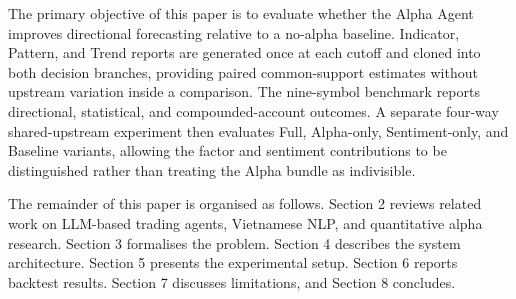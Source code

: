 The primary objective of this paper is to evaluate whether the Alpha Agent improves directional forecasting relative to a no-alpha baseline. Indicator, Pattern, and Trend reports are generated once at each cutoff and cloned into both decision branches, providing paired common-support estimates without upstream variation inside a comparison. The nine-symbol benchmark reports directional, statistical, and compounded-account outcomes. A separate four-way shared-upstream experiment then evaluates Full, Alpha-only, Sentiment-only, and Baseline variants, allowing the factor and sentiment contributions to be distinguished rather than treating the Alpha bundle as indivisible.

The remainder of this paper is organised as follows. Section 2 reviews related work on LLM-based trading agents, Vietnamese NLP, and quantitative alpha research. Section 3 formalises the problem. Section 4 describes the system architecture. Section 5 presents the experimental setup. Section 6 reports backtest results. Section 7 discusses limitations, and Section 8 concludes.
